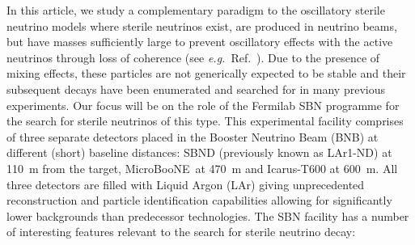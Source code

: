 \documentclass[11pt, a4paper]{article}
\newcommand{\refref}[1]{Ref.~\cite{#1}}
\def\eg{\emph{e.g.}}
\def\muboone{MicroBooNE}
\newcommand{\newtext}[2]{\textcolor{#1}{\ul{#2}}}
\begin{document}
In this article, we study a complementary paradigm to the oscillatory sterile
neutrino models where sterile neutrinos exist, are produced in neutrino beams,
but have masses sufficiently large to prevent oscillatory effects with the
active neutrinos through loss of coherence (see \eg\ \refref{Akhmedov:2009rb}).
Due to the presence of mixing effects, these particles are not generically
expected to be stable and their subsequent decays have been enumerated
\cite{Atre:2009rg} and searched for in many previous experiments.
%
Our focus will be on the role of the Fermilab SBN programme \cite{Antonello:2015lea}
for the search for sterile neutrinos of this type.
%
This experimental facility comprises of three separate detectors placed in the
Booster Neutrino Beam (BNB) at different (short) baseline distances: SBND
(previously known as LAr1-ND) at 110~m from the target, \muboone\ at 470~m and
Icarus-T600 at 600~m.  All three detectors are filled with Liquid Argon (LAr)
giving unprecedented reconstruction and particle identification capabilities
allowing for significantly lower backgrounds than predecessor technologies. 
%
%
The SBN facility has a number of interesting features relevant to the search
for sterile neutrino decay:
\end{document}

